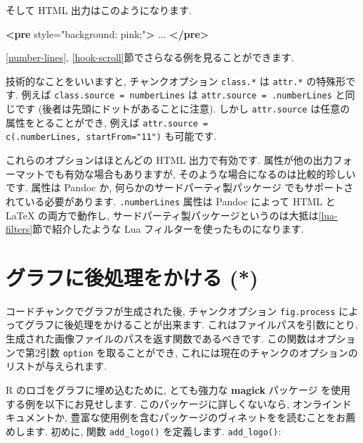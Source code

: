 \documentclass[
  11pt,
]{bxjsreport}
\newenvironment{Shaded}{\begin{snugshade}}{\end{snugshade}}
\newcommand{\KeywordTok}[1]{\textcolor[rgb]{0.13,0.29,0.53}{\textbf{#1}}}
\newcommand{\NormalTok}[1]{#1}
\newcommand{\OtherTok}[1]{\textcolor[rgb]{0.56,0.35,0.01}{#1}}
\newcommand{\StringTok}[1]{\textcolor[rgb]{0.31,0.60,0.02}{#1}}
\begin{document}
そして HTML 出力はこのようになります.

\begin{Shaded}
\begin{Highlighting}[]
\KeywordTok{\textless{}pre}\OtherTok{ style=}\StringTok{"background: pink;"}\KeywordTok{\textgreater{}}
\NormalTok{...}
\KeywordTok{\textless{}/pre\textgreater{}}
\end{Highlighting}
\end{Shaded}

\ref{number-lines}, \ref{hook-scroll}節でさらなる例を見ることができます.

技術的なことをいいますと, チャンクオプション \texttt{class.*} は \texttt{attr.*} の特殊形です. 例えば \texttt{class.source = \textquotesingle{}numberLines\textquotesingle{}} は \texttt{attr.source = \textquotesingle{}.numberLines\textquotesingle{}} と同じです (後者は先頭にドットがあることに注意). しかし \texttt{attr.source} は任意の属性をとることができ, 例えば \texttt{attr.source = c(\textquotesingle{}.numberLines\textquotesingle{},\ \textquotesingle{}startFrom="11"\textquotesingle{})} も可能です.

これらのオプションはほとんどの HTML 出力で有効です. 属性が他の出力フォーマットでも有効な場合もありますが, そのような場合になるのは比較的珍しいです. 属性は Pandoc か, 何らかのサードパーティ製パッケージ でもサポートされている必要があります. \texttt{.numberLines} 属性は Pandoc によって HTML と LaTeX の両方で動作し, サードパーティ製パッケージというのは大抵は\ref{lua-filters}節で紹介したような Lua フィルターを使ったものになります.

\hypertarget{fig-process}{%
\section{グラフに後処理をかける (*)}\label{fig-process}}

コードチャンクでグラフが生成された後, チャンクオプション \texttt{fig.process} によってグラフに後処理をかけることが出来ます. これはファイルパスを引数にとり, 生成された画像ファイルのパスを返す関数であるべきです. この関数はオプションで第2引数 \texttt{option} を取ることができ, これには現在のチャンクのオプションのリストが与えられます.

R のロゴをグラフに埋め込むために, とても強力な \textbf{magick} パッケージ \autocite{R-magick} を使用する例を以下にお見せします. このパッケージに詳しくないなら, オンラインドキュメントか, 豊富な使用例を含むパッケージのヴィネットをを読むことをお薦めします. 初めに, 関数 \texttt{add\_logo()} を定義します. \texttt{add\_logo()}:
\end{document}
